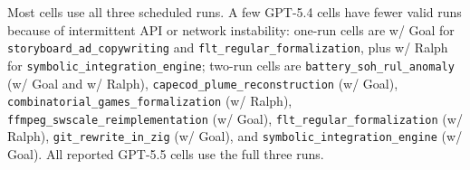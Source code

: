 Most cells use all three scheduled runs. A few GPT-5.4 cells have fewer valid runs because of intermittent API or network instability: one-run cells are w/ Goal for \texttt{storyboard\_\allowbreak{}ad\_\allowbreak{}copywriting} and \texttt{flt\_\allowbreak{}regular\_\allowbreak{}formalization}, plus w/ Ralph for \texttt{symbolic\_integration\_engine}; two-run cells are \texttt{battery\_\allowbreak{}soh\_\allowbreak{}rul\_\allowbreak{}anomaly} (w/ Goal and w/ Ralph), \texttt{capecod\_\allowbreak{}plume\_\allowbreak{}reconstruction} (w/ Goal), \texttt{combinatorial\_\allowbreak{}games\_\allowbreak{}formalization} (w/ Ralph), \texttt{ffmpeg\_\allowbreak{}swscale\_\allowbreak{}reimplementation} (w/ Goal), \texttt{flt\_\allowbreak{}regular\_\allowbreak{}formalization} (w/ Ralph), \texttt{git\_\allowbreak{}rewrite\_\allowbreak{}in\_\allowbreak{}zig} (w/ Goal), and \texttt{symbolic\_integration\_engine} (w/ Goal). All reported GPT-5.5 cells use the full three runs.
